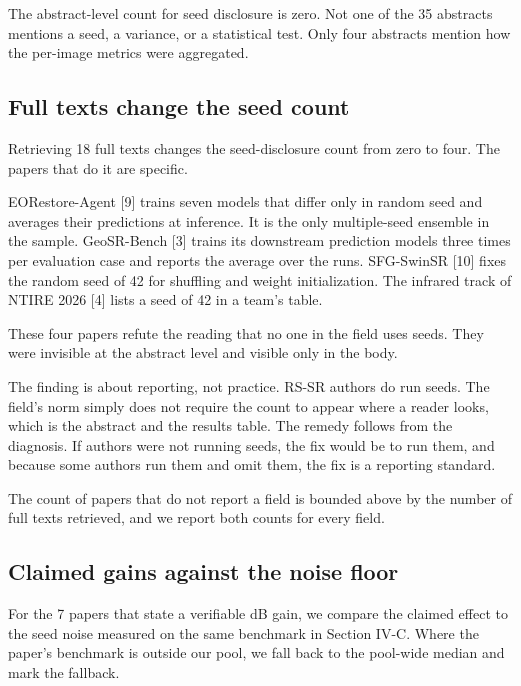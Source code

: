 \documentclass[journal,twoside,10pt]{IEEEtran}
\begin{document}
The abstract-level count for seed disclosure is zero. Not one of the 35 abstracts mentions a seed, a variance, or a statistical test. Only four abstracts mention how the per-image metrics were aggregated.

\subsection{Full texts change the seed count}


Retrieving 18 full texts changes the seed-disclosure count from zero to four. The papers that do it are specific.

EORestore-Agent [9] trains seven models that differ only in random seed and averages their predictions at inference. It is the only multiple-seed ensemble in the sample. GeoSR-Bench [3] trains its downstream prediction models three times per evaluation case and reports the average over the runs. SFG-SwinSR [10] fixes the random seed of 42 for shuffling and weight initialization. The infrared track of NTIRE 2026 [4] lists a seed of 42 in a team's table.

These four papers refute the reading that no one in the field uses seeds. They were invisible at the abstract level and visible only in the body.

The finding is about reporting, not practice. RS-SR authors do run seeds. The field's norm simply does not require the count to appear where a reader looks, which is the abstract and the results table. The remedy follows from the diagnosis. If authors were not running seeds, the fix would be to run them, and because some authors run them and omit them, the fix is a reporting standard.

The count of papers that do not report a field is bounded above by the number of full texts retrieved, and we report both counts for every field.

\subsection{Claimed gains against the noise floor}


For the 7 papers that state a verifiable dB gain, we compare the claimed effect to the seed noise measured on the same benchmark in Section IV-C. Where the paper's benchmark is outside our pool, we fall back to the pool-wide median and mark the fallback.
\end{document}
